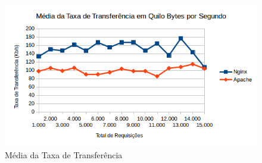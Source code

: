 \begin{figure}[H]
	\centering
	\includegraphics[width=1\linewidth]{graficos/grafico6} 
	\caption{Média da Taxa de Transferência}
	\label{fig:grafico6}
\end{figure}




